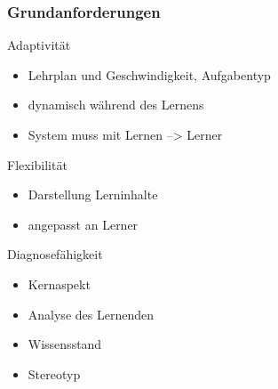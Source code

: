 \documentclass{beamer}
\begin{document}
\begin{frame}
  \frametitle{Grundanforderungen}
  \begin{block}{Adaptivität}
    \begin{itemize}
      \item Lehrplan und Geschwindigkeit, Aufgabentyp
      \item dynamisch während des Lernens
      \item System muss mit Lernen --> Lerner
    \end{itemize}
  \end{block}

  \begin{block}{Flexibilität}
    \begin{itemize}
      \item Darstellung Lerninhalte
      \item angepasst an Lerner
    \end{itemize}
  \end{block}

  \begin{block}{Diagnosefähigkeit}
    \begin{itemize}
      \item Kernaspekt
      \item Analyse des Lernenden
      \item Wissensstand
      \item Stereotyp
    \end{itemize}
  \end{block}
\end{frame}
\end{document}
